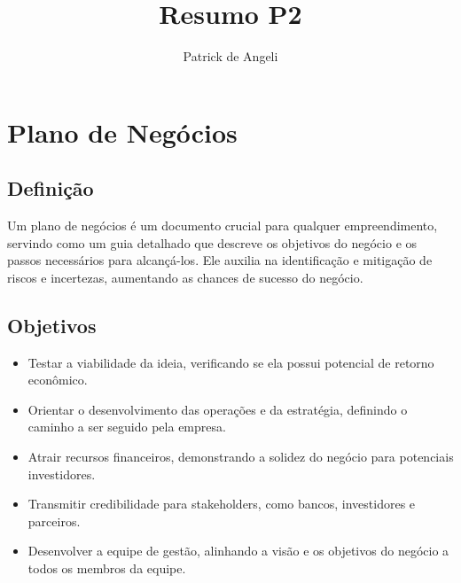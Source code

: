 \documentclass{article}
\begin{document}
\title{Resumo P2}
\author{Patrick de Angeli}
\maketitle

\tableofcontents

\section{Plano de Negócios}

\subsection{Definição}
Um plano de negócios é um documento crucial para qualquer empreendimento, servindo como um guia detalhado que descreve os objetivos do negócio e os passos necessários para alcançá-los. Ele auxilia na identificação e mitigação de riscos e incertezas, aumentando as chances de sucesso do negócio.

\subsection{Objetivos}
\begin{itemize}
    \item Testar a viabilidade da ideia, verificando se ela possui potencial de retorno econômico.
    \item Orientar o desenvolvimento das operações e da estratégia, definindo o caminho a ser seguido pela empresa.
    \item Atrair recursos financeiros, demonstrando a solidez do negócio para potenciais investidores.
    \item Transmitir credibilidade para stakeholders, como bancos, investidores e parceiros.
    \item Desenvolver a equipe de gestão, alinhando a visão e os objetivos do negócio a todos os membros da equipe.
\end{itemize}
\end{document}
